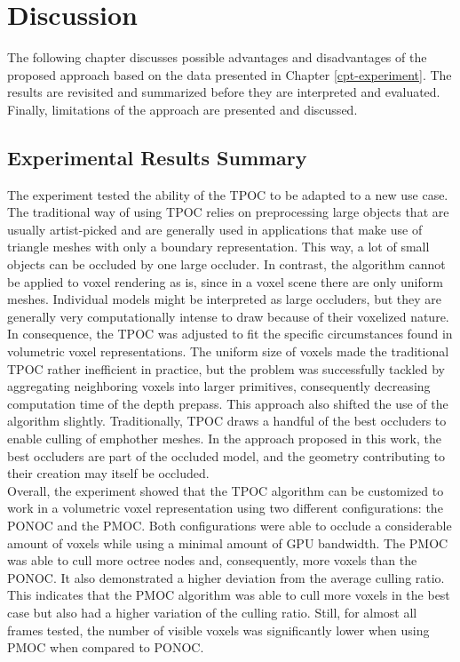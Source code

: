 \chapter{Discussion} \label{cpt-discussion}

The following chapter discusses possible advantages and disadvantages of the proposed approach based on 
the data presented in Chapter \ref{cpt-experiment}. The results are revisited and summarized before they 
are interpreted and evaluated. Finally, limitations of the approach are presented and discussed.

\section{Experimental Results Summary}

The experiment tested the ability of the \ac{TPOC} to be adapted to a new use case. The traditional way of 
using \ac{TPOC} relies on preprocessing large objects that are usually artist-picked and are generally used 
in applications that make use of triangle meshes with only a boundary representation. This way, a lot of 
small objects can be occluded by one large occluder. In contrast, the algorithm cannot be applied to voxel 
rendering as is, since in a voxel scene there are only uniform meshes. Individual models might be interpreted 
as large occluders, but they are generally very computationally intense to draw because of their voxelized 
nature. \\

\noindent
In consequence, the \ac{TPOC} was adjusted to fit the specific circumstances found in volumetric voxel representations. 
The uniform size of voxels made the traditional \ac{TPOC} rather inefficient in practice, but the problem was 
successfully tackled by aggregating neighboring voxels into larger primitives, consequently decreasing computation 
time of the depth prepass. This approach also shifted the use of the algorithm slightly. Traditionally, \ac{TPOC} 
draws a handful of the best occluders to enable culling of emph{other} meshes. In the approach proposed in this work, 
the best occluders are part of the occluded model, and the geometry contributing to their creation may itself be 
occluded. \\

\noindent
Overall, the experiment showed that the \ac{TPOC} algorithm can be customized to work in a volumetric voxel 
representation using two different configurations: the \ac{PONOC} and the \ac{PMOC}. 
Both configurations were able to occlude a considerable amount of voxels while using a minimal amount of 
\ac{GPU} bandwidth. The \ac{PMOC} was able to cull more octree nodes and, consequently, more 
voxels than the \ac{PONOC}. It also demonstrated a higher deviation from the average culling 
ratio. This indicates that the \ac{PMOC} algorithm was able to cull more voxels in the best case but also 
had a higher variation of the culling ratio. Still, for almost all frames tested, the number of visible 
voxels was significantly lower when using \ac{PMOC} when compared to \ac{PONOC}.\\

